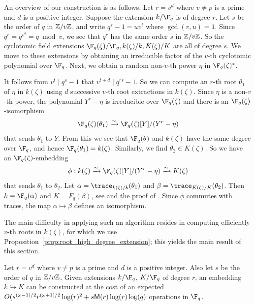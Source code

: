 An overview of our construction is as follows. Let $r = v^d$ where $v \ne p$ is a 
prime and $d$ is a positive integer. Suppose the extension $k/\F_q$ is of degree $r$. Let $s$ be 
the order of $q$ in $\mathbb{Z} / v\mathbb{Z}$, and write $q^s - 1 = uv^t$ where $\gcd(v, u) = 1$. Since $q^r = 
q^{v^d} = q \bmod v$, we see that $q^r$ has the same order $s$ in $\mathbb{Z} / v\mathbb{Z}$. So the cyclotomic 
field extensions $\F_q(\zeta) / \F_q, k(\zeta) / k, K(\zeta) / K$ are all of degree $s$. We move to 
these extensions by obtaining an irreducible factor of the $v$-th cyclotomic polynomial over 
$\F_q$. Next, we obtain a random non-$v$-th power $\eta$ in $\F_q(\zeta)^*$.

It follows from $v^t \mid q^s - 1$ that $v^{t + d} \mid q^{rs} - 1$. So we can compute an $r$-th 
root $\theta_1$ of $\eta$ in $k(\zeta)$ using $d$ successive $v$-th root extractions in $k(\zeta)$. 
Since $\eta$ is a non-$v$-th power, the polynomial $Y^r - \eta$ is irreducible over $\F_q(\zeta)$ 
and there is an $\F_q(\zeta)$-isomorphism 
\[ \F_q(\zeta)(\theta_1) \xrightarrow{\sim} \F_q(\zeta)[Y] / (Y^r - \eta) \]
that sends $\theta_1$ to $Y$. From this we see that $\F_q(\theta)$ and $k(\zeta)$ have the same 
degree over $\F_q$, and hence $\F_q(\theta_1) = k(\zeta)$. Similarly, we find $\theta_2 \in 
K(\zeta)$. So we have an $\F_q(\zeta)$-embedding
\[ \phi: k(\zeta) \xrightarrow{\sim} \F_q(\zeta)[Y] / (Y^r - \eta) \xrightarrow{\sim} K(\zeta) \]
that sends $\theta_1$ to $\theta_2$. Let $\alpha = \trace_{k(\zeta) / k}(\theta_1)$ and $\beta = 
\trace_{K(\zeta) / K}(\theta_2)$. Then $k = \F_q(\alpha)$ and $K = F_q(\beta)$, see \cite[Algorithm 
13]{shoup93} and the proof of \cite[Theorem 2.1]{Shoup90}. Since $\phi$ commutes with traces, the 
map $\alpha\mapsto\beta$ defines an isomorphism.

The main difficulty in applying such an algorithm resides in computing efficiently $v$-th roots in 
$k(\zeta)$, for which we use Proposition~\ref{prop:root_high_degree_extension}; this yields the 
main result of this section.
\begin{theorem}
	\label{theorem:isom-root}
	Let $r = v^d$ where $v \ne p$ is a prime and $d$ is a positive integer. Also let $s$ be the 
	order of $q$ in $\mathbb{Z} / v\mathbb{Z}$. Given extensions $k/\F_q$, $K/\F_q$ of degree $r$, an
        embedding $k\hookrightarrow K$ can be constructed at the cost of 
an expected $O(s^{(\omega-1)/2}r^{(\omega+1)/2}\log(r)^2 + s\mathsf{M}(r)\log(r)\log(q)$
operations in $\F_q$.
\end{theorem}

